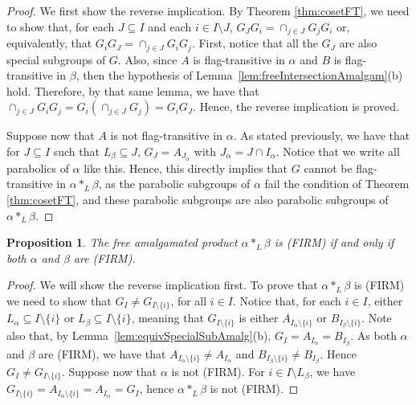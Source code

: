 \documentclass[11pt,letterpaper]{amsart}
\newtheorem{prop}{Proposition}[section]
\begin{document}
\begin{proof}
    We first show the reverse implication. By Theorem \ref{thm:cosetFT}, we need to show that, for each $J\subseteq I$ and each $i\in I\setminus J$, $G_JG_i = \cap_{j\in J} G_jG_i$ or, equivalently, that $G_iG_J = \cap_{j \in J} G_iG_j$.  
    First, notice that all the $G_J$ are also special subgroups of $G$. Also, since $A$ is flag-transitive in $\alpha$ and $B$ is flag-transitive in $\beta$, then the hypothesis of Lemma~\ref{lem:freeIntersectionAmalgam}(b) hold. Therefore, by that same lemma, we have that $\cap_{j \in J} G_iG_j = G_i (\cap_{j \in J} G_j) = G_iG_J$. Hence, the reverse implication is proved.

    Suppose now that $A$ is not flag-transitive in  $\alpha$. 
    As stated previously, we have that for $J\subseteq I$ such that $L_\beta\subseteq J$, $G_J = A_{J_\alpha}$ with $J_\alpha=J\cap I_\alpha$. Notice that we write all parabolics of $\alpha$ like this. Hence, this directly implies that $G$ cannot be flag-transitive in $\alpha *_L \beta$, as the parabolic subgroups of $\alpha$ fail the condition of Theorem \ref{thm:cosetFT}, and these parabolic subgroups are also parabolic subgroups of $\alpha *_L \beta$.
\end{proof}

\begin{prop}\label{prop:FIRM_FPAmalg}
The free amalgamated product $\alpha *_L \beta$ is (FIRM) if and only if both $\alpha$ and $\beta$ are (FIRM).
\end{prop}
\begin{proof}
    We will show the reverse implication first. To prove that $\alpha *_L \beta$ is (FIRM) we need to show that $G_I\neq G_{I\setminus\{i\}}$, for all $i\in I$. Notice that, for each $i\in I$, either $L_\alpha\subseteq I\setminus\{i\}$ or $L_\beta\subseteq I\setminus\{i\}$, meaning that $G_{I\setminus\{i\}}$ is either $A_{I_\alpha\setminus\{i\}}$ or $B_{I_\beta\setminus\{i\}}$. Note also that, by Lemma~\ref{lem:equivSpecialSubAmalg}(b), $G_I = A_{I_\alpha} = B_{I_\beta}$. As both $\alpha$ and $\beta$ are (FIRM), we have that $A_{I_\alpha\setminus\{i\}}\neq A_{I_\alpha}$ and $B_{I_\beta\setminus\{i\}}\neq B_{I_\beta}$. Hence $G_I\neq G_{I\setminus\{i\}}$.
    Suppose now that $\alpha$ is not (FIRM). For $i\in I\setminus L_{\beta}$, we have $G_{I\setminus\{i\}} = A_{I_\alpha\setminus\{i\}} = A_{I_\alpha} = G_I$, hence $\alpha *_L \beta$ is not (FIRM).
\end{proof}
\end{document}
